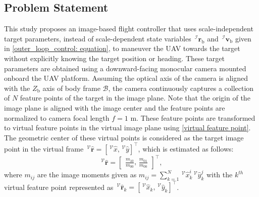 \documentclass[lettersize,journal]{IEEEtran}
\begin{document}
\subsection{Problem Statement} \label{problem statement: section}
This study proposes an image-based flight controller that uses scale-independent target parameters, instead of scale-dependent state variables $\,^\mathcal{I} \boldsymbol{r}_{\text{b}}$ and $\,^\mathcal{I} \boldsymbol{v}_{\text{b}}$ given in \eqref{outer_loop_control: equation}, to maneuver the UAV towards the target without explicitly knowing the target position or heading.
These target parameters are obtained using a downward-facing monocular camera mounted onboard the UAV platform. 
Assuming the optical axis of the camera is aligned with the $Z_{\text{b}}$ axis of body frame $\mathcal{B}$, the camera continuously captures a collection of $N$ feature points of the target in the image plane.
Note that the origin of the image plane is aligned with the image center and the feature points are normalized to camera focal length $f = 1$ m.
These feature points are transformed to virtual feature points in the virtual image plane using \eqref{virtual feature point}. 
The geometric center of these virtual points is considered as the target image point in the virtual frame $\,^\mathcal{V} \hat{\boldsymbol{r}} = [\,^\mathcal{V} \hat{x}, \,^\mathcal{V} \hat{y}]^{\top}$, which is estimated as follows:
\begin{equation}
\label{image point: equation}
    \,^\mathcal{V} \hat{\boldsymbol{r}} = \begin{bmatrix} \frac{m_{10}}{m_{00}},\,\frac{m_{01}}{m_{00}} \end{bmatrix}^{\top}, 
\end{equation}
where $m_{ij}$ are the image moments given as $m_{ij} = \sum^{N}_{k=1} \,^\mathcal{V} \hat{x}_k^i \,^\mathcal{V} \hat{y}_k^j$ with the $k^{th}$ virtual feature point represented as $\,^\mathcal{V} \hat{\boldsymbol{r}}_k = [\,^\mathcal{V} \hat{x}_k, \,^\mathcal{V} \hat{y}_k]^{\top}$.
\end{document}
